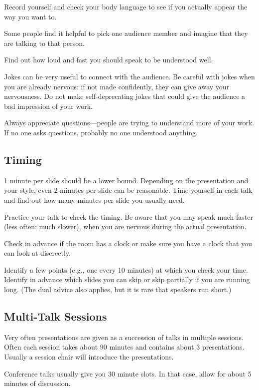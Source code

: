 \documentclass[12pt]{article}
\begin{document}
Record yourself and check your body language to see if you actually appear the way you want to.
\medskip

Some people find it helpful to pick one audience member and imagine that they are talking to that person.
\medskip

Find out how loud and fast you should speak to be understood well.
\medskip

Jokes can be very useful to connect with the audience.
Be careful with jokes when you are already nervous: if not made confidently, they can give away your nervousness.
Do not make self-deprecating jokes that could give the audience a bad impression of your work.
\medskip

Always appreciate questions---people are trying to understand more of your work.
If no one asks questions, probably no one understood anything.

\subsection{Timing}

1 minute per slide should be a lower bound.
Depending on the presentation and your style, even 2 minutes per slide can be reasonable.
Time yourself in each talk and find out how many minutes per slide you usually need.
\medskip

Practice your talk to check the timing.
Be aware that you may speak much faster (less often: much slower), when you are nervous during the actual presentation.
\medskip

Check in advance if the room has a clock or make sure you have a clock that you can look at discreetly.
\medskip

Identify a few points (e.g., one every 10 minutes) at which you check your time.
Identify in advance which slides you can skip or skip partially if you are running long.
(The dual advice also applies, but it is rare that speakers run short.)

\subsection{Multi-Talk Sessions}

Very often presentations are given as a succession of talks in multiple sessions.
Often each session takes about $90$ minutes and contains about $3$ presentations.
Usually a session chair will introduce the presentations.
\medskip

Conference talks usually give you 30 minute slots.
In that case, allow for about 5 minutes of discussion.
\medskip
\end{document}
